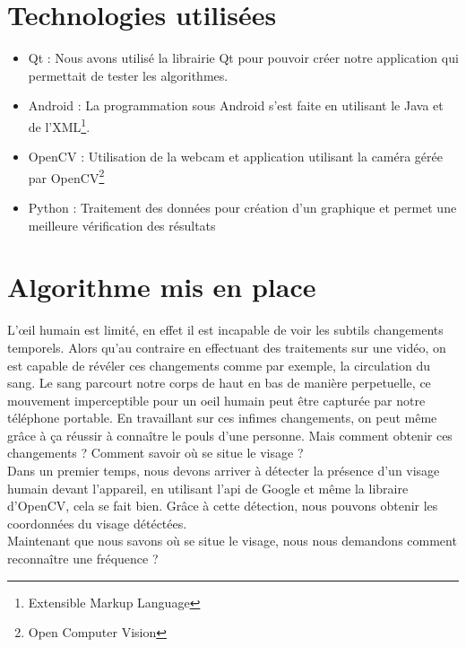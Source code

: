 \section{Technologies utilisées}

\begin{itemize}[label=\textbullet]
	\item Qt : Nous avons utilisé la librairie Qt pour pouvoir créer notre application qui permettait de tester les algorithmes.
	\item Android : La programmation sous Android s'est faite en utilisant le Java et de l'XML\footnote{Extensible Markup Language}.
	\item OpenCV : Utilisation de la webcam et application utilisant la caméra gérée par OpenCV\footnote{Open Computer Vision}
	\item Python : Traitement des données pour création d'un graphique et permet une meilleure vérification des résultats
\end{itemize}

\section{Algorithme mis en place}

L’\oe il humain est limité, en effet il est incapable de voir les subtils changements temporels. Alors qu'au contraire en effectuant des traitements sur une vidéo, on est capable de
 révéler ces changements comme par exemple, la circulation du sang. Le sang parcourt notre corps de haut en bas de manière perpetuelle, ce mouvement imperceptible pour un oeil humain peut
 être capturée par notre téléphone portable. En travaillant sur ces infimes changements, on peut même grâce à ça réussir à connaître le pouls d'une personne. Mais comment obtenir ces
  changements ? Comment savoir où se situe le visage ?\\

Dans un premier temps, nous devons arriver à détecter la présence d'un visage humain devant l'appareil, en utilisant l'api de Google et même la libraire d'OpenCV, cela se fait bien.
Grâce à cette détection, nous pouvons obtenir les coordonnées du visage détéctées.\\

Maintenant que nous savons où se situe le visage, nous nous demandons comment reconnaître une fréquence ?\\

